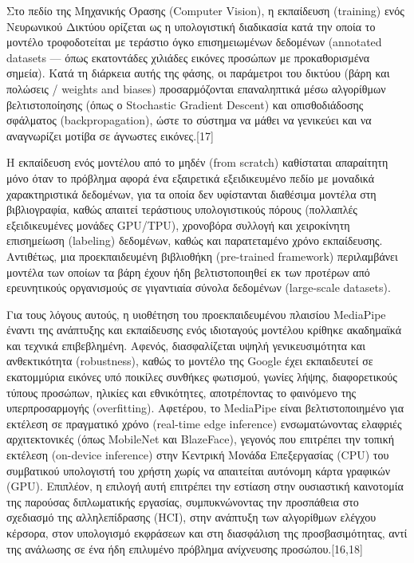 \documentclass[twoside, a4paper, 11pt]{article}
\begin{document}
Στο πεδίο της Μηχανικής Όρασης (Computer Vision), η εκπαίδευση (training) ενός Νευρωνικού Δικτύου ορίζεται ως η υπολογιστική διαδικασία κατά την οποία το μοντέλο τροφοδοτείται με τεράστιο
όγκο επισημειωμένων δεδομένων (annotated datasets — όπως εκατοντάδες χιλιάδες εικόνες προσώπων
με προκαθορισμένα σημεία). Κατά τη διάρκεια αυτής της φάσης, οι παράμετροι του δικτύου (βάρη και
πολώσεις / weights and biases) προσαρμόζονται επαναληπτικά μέσω αλγορίθμων βελτιστοποίησης (όπως
ο Stochastic Gradient Descent) και οπισθοδιάδοσης σφάλματος (backpropagation), ώστε το σύστημα να
μάθει να γενικεύει και να αναγνωρίζει μοτίβα σε άγνωστες εικόνες.[17]

Η εκπαίδευση ενός μοντέλου από το μηδέν (from scratch) καθίσταται απαραίτητη μόνο όταν το πρόβλημα αφορά ένα εξαιρετικά εξειδικευμένο πεδίο με μοναδικά χαρακτηριστικά δεδομένων, για τα οποία
δεν υφίστανται διαθέσιμα μοντέλα στη βιβλιογραφία, καθώς απαιτεί τεράστιους υπολογιστικούς πόρους
(πολλαπλές εξειδικευμένες μονάδες GPU/TPU), χρονοβόρα συλλογή και χειροκίνητη επισημείωση (labeling) δεδομένων, καθώς και παρατεταμένο χρόνο εκπαίδευσης. Αντιθέτως, μια προεκπαιδευμένη βιβλιοθήκη (pre-trained framework) περιλαμβάνει μοντέλα των οποίων τα βάρη έχουν ήδη βελτιστοποιηθεί
εκ των προτέρων από ερευνητικούς οργανισμούς σε γιγαντιαία σύνολα δεδομένων (large-scale datasets).

Για τους λόγους αυτούς, η υιοθέτηση του προεκπαιδευμένου πλαισίου MediaPipe έναντι της ανάπτυξης
και εκπαίδευσης ενός ιδιοταγούς μοντέλου κρίθηκε ακαδημαϊκά και τεχνικά επιβεβλημένη. Αφενός, διασφαλίζεται υψηλή γενικευσιμότητα και ανθεκτικότητα (robustness), καθώς το μοντέλο της Google έχει
εκπαιδευτεί σε εκατομμύρια εικόνες υπό ποικίλες συνθήκες φωτισμού, γωνίες λήψης, διαφορετικούς
τύπους προσώπων, ηλικίες και εθνικότητες, αποτρέποντας το φαινόμενο της υπερπροσαρμογής (overfitting). Αφετέρου, το MediaPipe είναι βελτιστοποιημένο για εκτέλεση σε πραγματικό χρόνο (real-time
edge inference) ενσωματώνοντας ελαφριές αρχιτεκτονικές (όπως MobileNet και BlazeFace), γεγονός που
επιτρέπει την τοπική εκτέλεση (on-device inference) στην Κεντρική Μονάδα Επεξεργασίας (CPU) του
συμβατικού υπολογιστή του χρήστη χωρίς να απαιτείται αυτόνομη κάρτα γραφικών (GPU). Επιπλέον, η
επιλογή αυτή επιτρέπει την εστίαση στην ουσιαστική καινοτομία της παρούσας διπλωματικής εργασίας,
συμπυκνώνοντας την προσπάθεια στο σχεδιασμό της αλληλεπίδρασης (HCI), στην ανάπτυξη των αλγορίθμων ελέγχου κέρσορα, στον υπολογισμό εκφράσεων και στη διασφάλιση της προσβασιμότητας, αντί
της ανάλωσης σε ένα ήδη επιλυμένο πρόβλημα ανίχνευσης προσώπου.[16,18]
\end{document}
